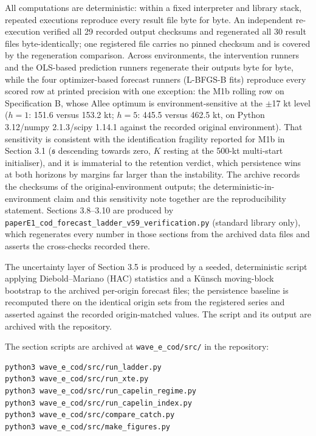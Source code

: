\documentclass[11pt]{article}
\begin{document}
All computations are deterministic: within a fixed interpreter and
library stack, repeated executions reproduce every result file byte for
byte. An independent re-execution verified all 29 recorded output
checksums and regenerated all 30 result files byte-identically; one
registered file carries no pinned checksum and is covered by the
regeneration comparison. Across environments, the intervention runners
and the OLS-based prediction runners regenerate their outputs byte for
byte, while the four optimizer-based forecast runners (L-BFGS-B fits)
reproduce every scored row at printed precision with one exception: the
M1b rolling row on Specification B, whose Allee optimum is
environment-sensitive at the \ensuremath{\pm}17 kt level (\(h=1\): 151.6
versus 153.2 kt; \(h=5\): 445.5 versus 462.5 kt, on Python
3.12/numpy 2.1.3/scipy 1.14.1 against the recorded original
environment). That sensitivity is consistent with the identification
fragility reported for M1b in Section 3.1 (\(\mathfrak s\) descending
towards zero, \(K\) resting at the 500-kt multi-start initialiser), and
it is immaterial to the retention verdict, which persistence wins at
both horizons by margins far larger than the instability. The archive
records the checksums of the original-environment outputs; the
deterministic-in-environment claim and this sensitivity note together
are the reproducibility statement. Sections 3.8--3.10 are produced by
\texttt{paperE1\_cod\_forecast\_ladder\_v59\_verification.py}
(standard library only), which regenerates every number in those
sections from the archived data files and asserts the cross-checks
recorded there.

The uncertainty layer of Section 3.5 is produced by a seeded,
deterministic script applying Diebold--Mariano (HAC) statistics and a
K\"unsch moving-block bootstrap to the archived per-origin forecast
files; the persistence baseline is recomputed there on the identical
origin sets from the registered series and asserted against the recorded
origin-matched values. The script and its output are archived with the
repository.

The section scripts are archived at \texttt{wave\_e\_cod/src/} in the
repository:
\begin{verbatim}
python3 wave_e_cod/src/run_ladder.py
python3 wave_e_cod/src/run_xte.py
python3 wave_e_cod/src/run_capelin_regime.py
python3 wave_e_cod/src/run_capelin_index.py
python3 wave_e_cod/src/compare_catch.py
python3 wave_e_cod/src/make_figures.py
\end{verbatim}
\end{document}
